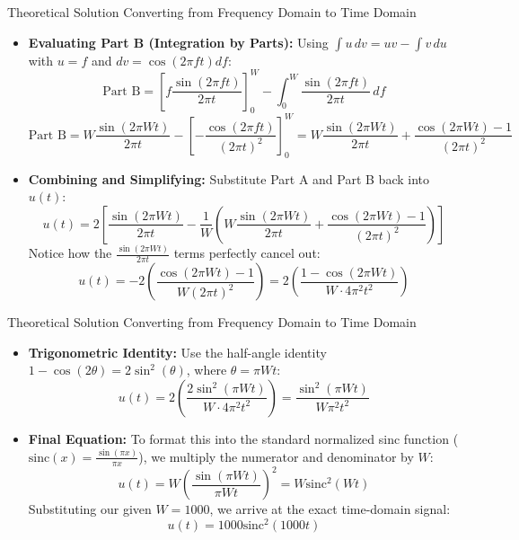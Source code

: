 \documentclass{beamer}
\begin{document}
\begin{frame}{Theoretical Solution}
{Converting from Frequency Domain to Time Domain}
\begin{itemize}
   \item \textbf{Evaluating Part B (Integration by Parts):} Using $\int u \, dv = uv - \int v \, du$ with $u=f$ and $dv=\cos(2\pi ft)df$:
    \[
    \text{Part B} = \left[ f \frac{\sin(2\pi ft)}{2\pi t} \right]_0^W - \int_{0}^{W} \frac{\sin(2\pi ft)}{2\pi t} \, df
    \]
    \[
    \text{Part B} = W \frac{\sin(2\pi Wt)}{2\pi t} - \left[ -\frac{\cos(2\pi ft)}{(2\pi t)^2} \right]_0^W = W \frac{\sin(2\pi Wt)}{2\pi t} + \frac{\cos(2\pi Wt) - 1}{(2\pi t)^2}
    \]

    \item \textbf{Combining and Simplifying:} Substitute Part A and Part B back into $u(t)$:
    \[
    u(t) = 2 \left[ \frac{\sin(2\pi Wt)}{2\pi t} - \frac{1}{W} \left( W \frac{\sin(2\pi Wt)}{2\pi t} + \frac{\cos(2\pi Wt) - 1}{(2\pi t)^2} \right) \right]
    \]
    Notice how the $\frac{\sin(2\pi Wt)}{2\pi t}$ terms perfectly cancel out:
    \[
    u(t) = -2 \left( \frac{\cos(2\pi Wt) - 1}{W(2\pi t)^2} \right) = 2 \left( \frac{1 - \cos(2\pi Wt)}{W \cdot 4\pi^2 t^2} \right)
    \]
\end{itemize}
    
\end{frame}

\begin{frame}{Theoretical Solution}
{Converting from Frequency Domain to Time Domain}
\begin{itemize}
    \item \textbf{Trigonometric Identity:} Use the half-angle identity $1 - \cos(2\theta) = 2\sin^2(\theta)$, where $\theta = \pi Wt$:
    \[
    u(t) = 2 \left( \frac{2\sin^2(\pi Wt)}{W \cdot 4\pi^2 t^2} \right) = \frac{\sin^2(\pi Wt)}{W \pi^2 t^2}
    \]

    \item \textbf{Final Equation:} To format this into the standard normalized sinc function ($\text{sinc}(x) = \frac{\sin(\pi x)}{\pi x}$), we multiply the numerator and denominator by $W$:
    \[
    u(t) = W \left( \frac{\sin(\pi Wt)}{\pi W t} \right)^2 = W \text{sinc}^2(Wt)
    \]
    Substituting our given $W = 1000$, we arrive at the exact time-domain signal:
    \[
    u(t) = 1000 \text{sinc}^2(1000t)
    \]
\end{itemize}
    
\end{frame}
\end{document}
